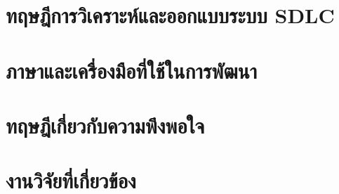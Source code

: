 \section{ทฤษฎีการวิเคราะห์และออกแบบระบบ SDLC}

\section{ภาษาและเครื่องมือที่ใช้ในการพัฒนา}

\section{ทฤษฎีเกี่ยวกับความพึงพอใจ}

\section{งานวิจัยที่เกี่ยวข้อง}

